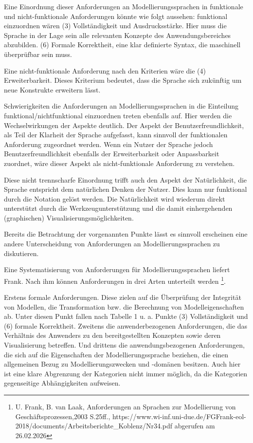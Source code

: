 Eine Einordnung dieser Anforderungen an Modellierungssprachen in funktionale und nicht-funktionale Anforderungen könnte wie folgt aussehen: 
funktional einzuordnen wären (3) Vollständigkeit und Ausdrucksstärke. Hier muss die Sprache in der Lage sein alle relevanten Konzepte des Anwendungsbereiches abzubilden. (6) Formale Korrektheit, eine klar definierte Syntax, die maschinell überprüfbar sein muss.

Eine nicht-funktionale Anforderung nach den Kriterien wäre die (4) Erweiterbarkeit. Dieses Kriterium bedeutet, dass die Sprache sich zukünftig um neue Konstrukte erweitern lässt.

Schwierigkeiten die Anforderungen an Modellierungssprachen in die Einteilung funktional/nichtfunktional einzuordnen treten ebenfalls auf. Hier werden die Wechselwirkungen der Aspekte deutlich. Der Aspekt der Benutzerfreundlichkeit, als Teil der Klarheit der Sprache aufgefasst, kann sinnvoll der funktionalen Anforderung zugeordnet werden. Wenn ein Nutzer der Sprache jedoch Benutzerfreundlichkeit ebenfalls der Erweiterbarkeit oder Anpassbarkeit zuordnet, wäre dieser Aspekt als nicht-funktionale Anforderung zu verstehen. 

Diese nicht trennscharfe Einordnung trifft auch den Aspekt der Natürlichkeit, die Sprache entspricht dem natürlichen Denken der Nutzer. Dies kann nur funktional durch die Notation gelöst werden. Die Natürlichkeit wird wiederum direkt unterstützt durch die Werkzeugunterstützung und die damit einhergehenden (graphischen) Visualisierungsmöglichkeiten.

Bereits die Betrachtung der vorgenannten Punkte lässt es sinnvoll erscheinen eine andere Unterscheidung von Anforderungen an Modellierungssprachen zu diskutieren. 

Eine Systematisierung von Anforderungen für Modellierungssprachen liefert Frank. Nach ihm können Anforderungen in drei Arten unterteilt werden \footnote{U. Frank, B. van Laak, Anforderungen an Sprachen zur Modellierung von Geschäftsprozessen,2003 S.25ff., https://www.wi-inf.uni-due.de/FGFrank-eol-2018/documents/Arbeitsberichte_Koblenz/Nr34.pdf abgerufen am 26.02.2026}.

Erstens formale Anforderungen. Diese zielen auf die Überprüfung der Integrität von Modellen, die Transformation bzw. die Berechnung von Modelleigenschaften ab. Unter diesen Punkt fallen nach Tabelle 1 u. a. Punkte (3) Vollständigkeit und (6) formale Korrektheit. Zweitens die anwenderbezogenen Anforderungen, die das Verhältnis des Anwenders zu den bereitgestellten Konzepten sowie deren Visualisierung betreffen. Und drittens die anwendungsbezogenen Anforderungen, die sich auf die Eigenschaften der Modellierungssprache beziehen, die einen allgemeinen Bezug zu Modellierungszwecken und -domänen besitzen. Auch hier ist eine klare Abgrenzung der Kategorien nicht immer möglich, da die Kategorien gegenseitige Abhängigkeiten aufweisen. 


